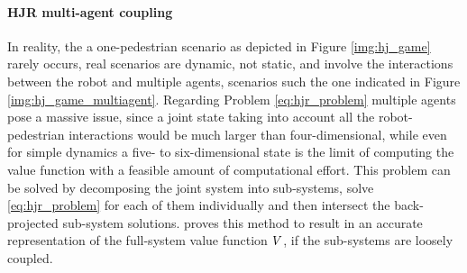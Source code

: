 \paragraph{\ac{HJR} multi-agent coupling}
In reality, the a one-pedestrian scenario as depicted in Figure \ref{img:hj_game} rarely occurs, real scenarios are dynamic, not static, and involve the interactions between the robot and multiple agents, scenarios such the one indicated in Figure \ref{img:hj_game_multiagent}. Regarding Problem \ref{eq:hjr_problem} multiple agents pose a massive issue, since a joint state taking into account all the robot-pedestrian interactions would be much larger than four-dimensional, while even for simple dynamics a five- to six-dimensional state is the limit of computing the value function with a feasible amount of computational effort.
\newline
This problem can be solved by decomposing the joint system into sub-systems, solve \ref{eq:hjr_problem} for each of them individually and then intersect the back-projected sub-system solutions. \cite{Chen2016a} proves this method to result in an accurate representation of the full-system value function $V$, if the sub-systems are loosely coupled.

